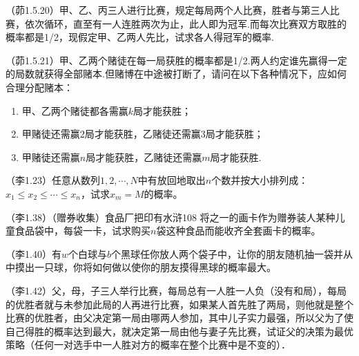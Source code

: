\begin{problemset}[错题记录]
    \item （茆1.5.20）甲、乙、丙三人进行比赛，规定每局两个人比赛，胜者与第三人比赛，依次循环，直至有一人连胜两次为止，此人即为冠军.而每次比赛双方取胜的概率都是1/2，现假定甲、乙两人先比，试求各人得冠军的概率.
    \item （茆1.5.21）甲、乙两个赌徒在每一局获胜的概率都是1/2.两人约定谁先赢得一定的局数就获得全部赌本.但赌博在中途被打断了，请问在以下各种情况下，应如何合理分配赌本：
    \begin{enumerate}
      \item 甲、乙两个赌徒都各需赢$k$局才能获胜；
      \item 甲赌徒还需赢2局才能获胜，乙赌徒还需赢3局才能获胜；
      \item 甲赌徒还需赢$n$局才能获胜，乙赌徒还需赢$m$局才能获胜.
    \end{enumerate}
    \item （李1.23）任意从数列$1,2,\cdots,N$中有放回地取出$n$个数并按大小排列成：$x_1\le x_2\le \cdots \le x_n$，试求$x_m=M$的概率。
    \item （李1.38）（赠券收集）食品厂把印有水浒108 将之一的画卡作为赠券装人某种儿童食品袋中，每袋一卡，试求购买$n$袋这种食品而能收齐全套画卡的概率。
    \item （李1.40）有$w$个白球与$b$个黑球任你放人两个袋子中，让你的朋友随机抽一袋并从中摸出一只球，你将如何做以使你的朋友摸得黑球的概率最大。
    \item （李1.42）父，母，子三人举行比赛，每局总有一人胜一人负（没有和局），每局的优胜者就与未参加此局的人再进行比赛，如果某人首先胜了两局，则他就是整个比赛的优胜者，由父决定第一局由哪两人参加，其中儿子实力最强，所以父为了使自己得胜的概率达到最大，就决定第一局由他与妻子先比赛，试证父的决策为最优策略（任何一对选手中一人胜对方的概率在整个比赛中是不变的）．
    \item 
\end{problemset}
